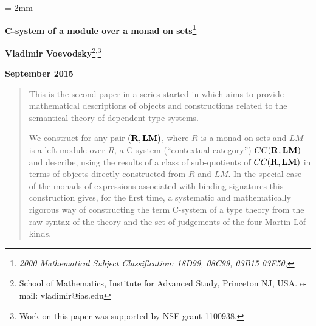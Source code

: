 \documentclass[11pt]{article}
\newcommand{\rr}{{\bf R}}
\newcommand{\lm}{{\bf LM}}
\begin{document}
%
\parskip = 2mm
\begin{center}
{\bf\Large C-system of a module over a monad on sets\footnote{\em 2000 Mathematical Subject Classification: 
%
18D99, %
08C99, %
03B15 %
03F50, %
%
}}


\vspace{3mm}

{\large\bf Vladimir Voevodsky}\footnote{School of Mathematics, Institute for Advanced Study,
Princeton NJ, USA. e-mail: vladimir@ias.edu}$^,$\footnote{Work on this paper was supported by NSF grant 1100938.}
\vspace {3mm}

{\large\bf September 2015}  
\end{center}

\begin{abstract}
This is the second paper in a series started in \cite{Csubsystems} which aims to provide mathematical descriptions of objects and constructions related to the semantical theory of dependent type systems. 

We construct for any pair $(\rr,\lm)$, where $R$ is a monad on sets and $LM$ is a left module over $R$, a C-system (``contextual category'') $CC(\rr,\lm)$ and describe, using the results of \cite{Csubsystems} a class of sub-quotients of $CC(\rr,\lm)$ in terms of objects directly constructed from $R$ and $LM$. In the special case of the monads of expressions associated with  binding signatures this construction gives, for the first time, a systematic and mathematically rigorous way of constructing the term C-system of a type theory from the raw syntax of the theory and the set of judgements of the four Martin-L\"{o}f kinds.
\end{abstract}


\end{document}
